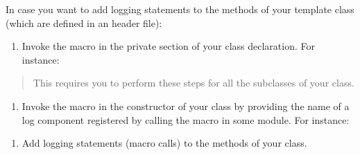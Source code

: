 \documentclass[letterpaper,10pt,english]{sphinxmanual}
\renewcommand{\sphinxcode}[1]{\texttt{\small{#1}}}
\begin{document}
In case you want to add logging statements to the methods of your template class
(which are defined in an header file):
\begin{enumerate}
%
\item {} 
Invoke the \sphinxcode{} macro in the private section of
your class declaration. For instance:

\end{enumerate}
\begin{quote}

\begin{sphinxVerbatim}[commandchars=\\\{\}]
  
    
              
                    
\end{sphinxVerbatim}

This requires you to perform these steps for all the subclasses of your class.
\end{quote}
\begin{enumerate}
%
\setcounter{enumi}{1}
\item {} 
Invoke the \sphinxcode{} macro in the constructor of
your class by providing the name of a log component registered by calling
the \sphinxcode{} macro in some module. For instance:

\end{enumerate}
\begin{quote}

\begin{sphinxVerbatim}[commandchars=\\\{\}]
  
 
    
\end{sphinxVerbatim}
\end{quote}
\begin{enumerate}
%
\setcounter{enumi}{2}
\item {} 
Add logging statements (macro calls) to the methods of your class.

\end{enumerate}
\end{document}
